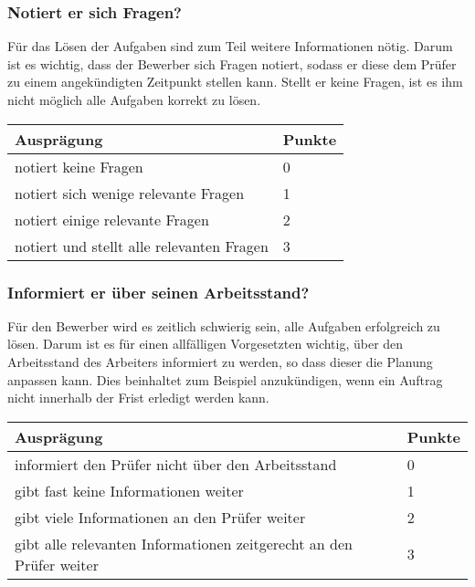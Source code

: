 \subsubsection{Notiert er sich Fragen?}
Für das Lösen der Aufgaben sind zum Teil weitere Informationen nötig. Darum ist es wichtig, dass der Bewerber sich Fragen notiert, sodass er diese dem Prüfer zu einem angekündigten Zeitpunkt stellen kann. Stellt er keine Fragen, ist es ihm nicht möglich alle Aufgaben korrekt zu lösen.


\begin{center}
  \begin{tabular}{ | p{7cm} | p{1cm} |}
   \hline
   \textbf{Ausprägung} & \textbf{Punkte} \\ \hline
   notiert keine Fragen & 0 \\ \hline
   notiert sich wenige relevante Fragen & 1 \\ \hline
   notiert einige relevante Fragen & 2 \\ \hline
   notiert und stellt alle relevanten Fragen  & 3\\ \hline
  \end{tabular}
\end{center}

\subsubsection{Informiert er über seinen Arbeitsstand?}
Für den Bewerber wird es zeitlich schwierig sein, alle Aufgaben erfolgreich zu lösen. Darum ist es für einen allfälligen Vorgesetzten wichtig, über den Arbeitsstand des Arbeiters informiert zu werden, so dass dieser die Planung anpassen kann. Dies beinhaltet zum Beispiel anzukündigen, wenn ein Auftrag nicht innerhalb der Frist erledigt werden kann.

\begin{center}
  \begin{tabular}{ | p{7cm} | p{1cm} |}
   \hline
   \textbf{Ausprägung} & \textbf{Punkte} \\ \hline
   informiert den Prüfer nicht über den Arbeitsstand & 0 \\ \hline
   gibt fast keine Informationen weiter & 1 \\ \hline
   gibt viele Informationen an den Prüfer weiter & 2 \\ \hline
   gibt alle relevanten Informationen zeitgerecht an den Prüfer weiter & 3\\ \hline
  \end{tabular}
\end{center}

